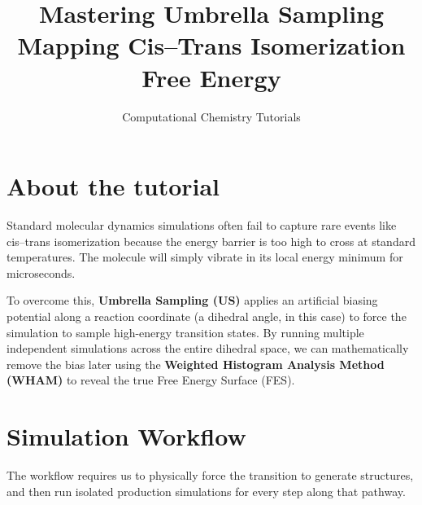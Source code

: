 \documentclass[12pt, a4paper]{article}
\title{\sffamily\Huge\bfseries Mastering Umbrella Sampling \\ \Large Mapping Cis--Trans Isomerization Free Energy}
\author{\sffamily Computational Chemistry Tutorials}
\date{}
\begin{document}
\maketitle

\begin{tocbox}
    \tableofcontents
\end{tocbox}
\vspace{2em}

\section*{About the tutorial}
Standard molecular dynamics simulations often fail to capture rare events like cis--trans isomerization because the energy barrier is too high to cross at standard temperatures. The molecule will simply vibrate in its local energy minimum for microseconds.

To overcome this, \textbf{Umbrella Sampling (US)} applies an artificial biasing potential along a reaction coordinate (a dihedral angle, in this case) to force the simulation to sample high-energy transition states. By running multiple independent simulations across the entire dihedral space, we can mathematically remove the bias later using the \textbf{Weighted Histogram Analysis Method (WHAM)} to reveal the true Free Energy Surface (FES).

\section{Simulation Workflow}
The workflow requires us to physically force the transition to generate structures, and then run isolated production simulations for every step along that pathway.

\begin{figure}[H]
\centering
{}
\end{figure}
\end{document}
